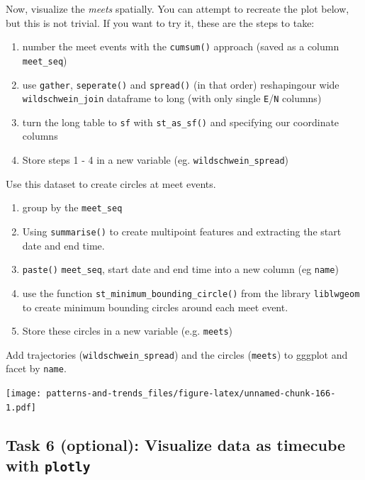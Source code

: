 \documentclass[]{book}
\providecommand{\tightlist}{%
  \setlength{\itemsep}{0pt}\setlength{\parskip}{0pt}}
\begin{document}
Now, visualize the \emph{meets} spatially. You can attempt to recreate the plot below, but this is not trivial. If you want to try it, these are the steps to take:

\begin{enumerate}
\def\labelenumi{\arabic{enumi}.}
\tightlist
\item
  number the meet events with the \texttt{cumsum()} approach (saved as a column \texttt{meet\_seq})
\item
  use \texttt{gather}, \texttt{seperate()} and \texttt{spread()} (in that order) reshapingour wide \texttt{wildschwein\_join} dataframe to long (with only single \texttt{E}/\texttt{N} columns)
\item
  turn the long table to \texttt{sf} with \texttt{st\_as\_sf()} and specifying our coordinate columns
\item
  Store steps 1 - 4 in a new variable (eg. \texttt{wildschwein\_spread})
\end{enumerate}

Use this dataset to create circles at meet events.

\begin{enumerate}
\def\labelenumi{\arabic{enumi}.}
\tightlist
\item
  group by the \texttt{meet\_seq}
\item
  Using \texttt{summarise()} to create multipoint features and extracting the start date and end time.
\item
  \texttt{paste()} \texttt{meet\_seq}, start date and end time into a new column (eg \texttt{name})
\item
  use the function \texttt{st\_minimum\_bounding\_circle()} from the library \texttt{liblwgeom} to create minimum bounding circles around each meet event.
\item
  Store these circles in a new variable (e.g. \texttt{meets})
\end{enumerate}

Add trajectories (\texttt{wildschwein\_spread}) and the circles (\texttt{meets}) to gggplot and facet by \texttt{name}.

\texttt{[image: patterns-and-trends\_files/figure-latex/unnamed-chunk-166-1.pdf]}

\hypertarget{task-6-optional-visualize-data-as-timecube-with-plotly}{%
\subsection{\texorpdfstring{Task 6 (optional): Visualize data as timecube with \texttt{plotly}}{Task 6 (optional): Visualize data as timecube with plotly}}\label{task-6-optional-visualize-data-as-timecube-with-plotly}}
\end{document}
